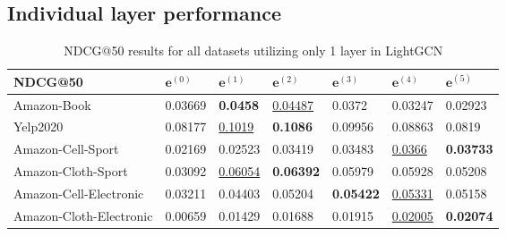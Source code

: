 \subsection{Individual layer performance} \label{subsec:individual-layer-combi}

\begin{table*}[]
    \centering
    \begin{tabular}{|l|l|l|l|l|l|l|}
        \hline
        NDCG@50                 & $\mathbf{e}^{(0)}$ & $\mathbf{e}^{(1)}$  & $\mathbf{e}^{(2)}$  & $\mathbf{e}^{(3)}$ & $\mathbf{e}^{(4)}$  & $\mathbf{e}^{(5)}$ \\ \hline
        Amazon-Book             & 0.03669            & \textbf{0.0458}     & \underline{0.04487} & 0.0372             & 0.03247             & 0.02923            \\ \hline
        Yelp2020                & 0.08177            & \underline{0.1019}  & \textbf{0.1086}     & 0.09956            & 0.08863             & 0.0819             \\ \hline
        Amazon-Cell-Sport       & 0.02169            & 0.02523             & 0.03419             & 0.03483            & \underline{0.0366}  & \textbf{0.03733}   \\ \hline
        Amazon-Cloth-Sport      & 0.03092            & \underline{0.06054} & \textbf{0.06392}    & 0.05979            & 0.05928             & 0.05208            \\ \hline
        Amazon-Cell-Electronic  & 0.03211            & 0.04403             & 0.05204             & \textbf{0.05422}   & \underline{0.05331} & 0.05158            \\ \hline
        Amazon-Cloth-Electronic & 0.00659            & 0.01429             & 0.01688             & 0.01915            & \underline{0.02005} & \textbf{0.02074}   \\ \hline
    \end{tabular}
    \caption{NDCG@50 results for all datasets utilizing only 1 layer in LightGCN}
    \label{tab:ndcg-individual}
\end{table*}

